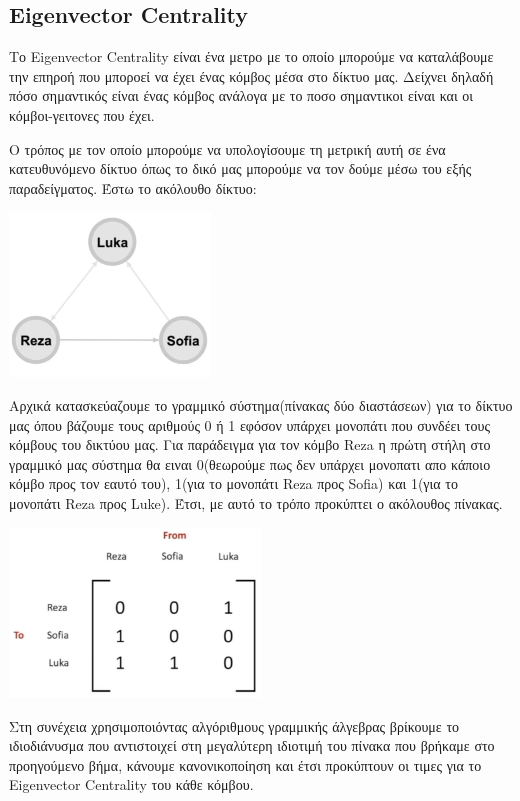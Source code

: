 \documentclass[12pt]{article}
\begin{document}
	\subsection{Eigenvector Centrality}
	Το Eigenvector Centrality είναι ένα μετρο με το οποίο μπορούμε να καταλάβουμε την επηροή που μποροεί να έχει ένας κόμβος μέσα στο δίκτυο μας. Δείχνει δηλαδή πόσο σημαντικός είναι ένας κόμβος ανάλογα με το ποσο σημαντικοι είναι και οι κόμβοι-γειτονες που έχει.
	\par
	Ο τρόπος με τον οποίο μπορούμε να υπολογίσουμε τη μετρική αυτή σε ένα κατευθυνόμενο δίκτυο όπως το δικό μας μπορούμε να τον δούμε μέσω του εξής παραδείγματος. Έστω το ακόλουθο δίκτυο:
	\begin{center}
		\includegraphics[width=0.4\textwidth]{photos-files/section7/eigenvector_entrality_example.JPG}
	\end{center}
	Αρχικά κατασκεύαζουμε το γραμμικό σύστημα(πίνακας δύο διαστάσεων) για το δίκτυο μας όπου βάζουμε τους αριθμούς 0 ή 1 εφόσον υπάρχει μονοπάτι που συνδέει τους κόμβους του δικτύου μας. Για παράδειγμα για τον κόμβο Reza η πρώτη στήλη στο γραμμικό μας σύστημα θα ειναι 0(θεωρούμε πως δεν υπάρχει μονοπατι απο κάποιο κόμβο προς τον εαυτό του), 1(για το μονοπάτι Reza προς Sofia) και 1(για το μονοπάτι Reza προς Luke). Έτσι, με αυτό το τρόπο προκύπτει ο ακόλουθος πίνακας.
	\begin{center}
		\includegraphics[width=0.5\textwidth]{photos-files/section7/eigenvector_entrality_examplev2.JPG}
	\end{center}
	
	\newpage
	Στη συνέχεια χρησιμοποιόντας αλγόριθμους γραμμικής άλγεβρας βρίκουμε το ιδιοδιάνυσμα που αντιστοιχεί στη μεγαλύτερη ιδιοτιμή του πίνακα που βρήκαμε στο προηγούμενο βήμα, κάνουμε κανονικοποίηση και έτσι προκύπτουν οι τιμες για το Eigenvector Centrality του κάθε κόμβου.
	
\end{document}
